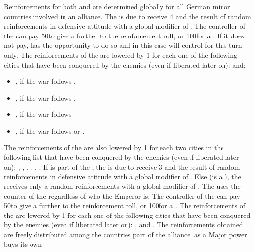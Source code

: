 \begin{digressions}
  \phadm
  \aparag Reinforcements for both \alliance and \ligue are determined globally
  for all German minor countries involved in an alliance.
  \aparag The \alliance is due to receive 4 \LD and the result of random
  reinforcements in defensive attitude with a global modifier of .
  \aparag The controller of the \alliance can pay 50\ducats to give a further
   to the reinforcement roll, or 100\ducats for a . If it
  does not pay, \SUE has the opportunity to do so and in this case will
  control \alliance for this turn only.
  \aparag The reinforcements of the \alliance are lowered by 1 \LD for each
  one of the following cities that have been conquered by the enemies (even if
  liberated later on): \villeMagdeburg and:
  \begin{itemize}
  \item \villeStuttgart, \villeErfurt if the war follows
    ,
  \item \villeMunster, \villeRostock if the war follows ,
  \item \villeSpeyer, \villePrague if the war follows 
  \item \villeFrankfurt, \villeErfurt if the war follows
     or .
  \end{itemize}
  \aparag The reinforcements of the \alliance are also lowered by 1 \LD for
  each two cities in the following list that have been conquered by the
  enemies (even if liberated later on): \villeHannover, \villeCassel,
  \villeDresden, \villeBerlin, \villeLubeck, \villeHamburg.
  \aparag If \AUSmin is part of the \ligue, the \ligue is due to receive 3 \LD
  and the result of random reinforcements in defensive attitude with a global
  modifier of . Else (\AUS is a \MAJ), the \ligue receives only a
  random reinforcements with a global modifier of .  The \ligue uses
  the \ARMY counter of the \HRE regardless of who the Emperor is.
  \aparag The controller of the \ligue can pay 50\ducats to give a further
   to the reinforcement roll, or 100\ducats for a .
  \aparag The reinforcements of the \ligue are lowered by 1 \LD for each one
  of the following cities that have been conquered by the enemies (even if
  liberated later on): \villeVienne, \villeSalzburg and \villeMunich.
  \bparag The reinforcements obtained are freely distributed among the
  countries part of the alliance. \AUS as a Major power buys its own

\end{digressions}

